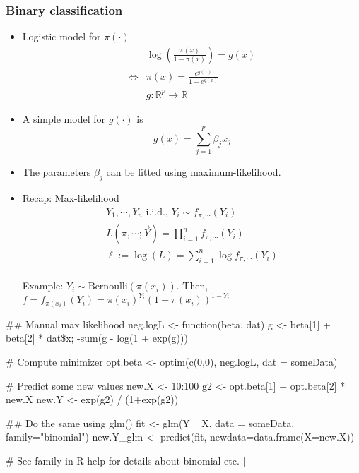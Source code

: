 \subsubsection{Binary classification}
\begin{theory}
 \begin{itemize}
  \item Logistic model for $\pi(\cdot)$
        \begin{align*}
                         & \log\left( \frac{\pi(x)}{1-\pi(x)} \right) = g(x)\\
         \Leftrightarrow & \pi(x) = \frac{e^{g(x)}}{1+e^{g(x)}}\\
                         & g: \mathbb{R}^p \rightarrow \mathbb{R}
        \end{align*}
  \item A simple model for $g(\cdot)$ is
        \begin{equation*}
         g(x) = \sum_{j=1}^p \beta_jx_j
        \end{equation*}
  \item The parameters $\beta_j$ can be fitted using maximum-likelihood.
  \item Recap: Max-likelihood
        \begin{gather*}
         Y_1, \cdots, Y_n \text{ i.i.d., } Y_i \sim f_{\pi, \cdots}(Y_i)\\
         L(\pi, \cdots; \vec{Y}) = \prod_{i=1}^n f_{\pi, \cdots}(Y_i)\\
         \ell := \log(L) = \sum_{i=1}^n \log f_{\pi, \cdots}(Y_i)
        \end{gather*}\\
        Example: $Y_i \sim \text{Bernoulli}(\pi(x_i))$. Then, $f = f_{\pi(x_i)}(Y_i) = \pi(x_i)^{Y_i} (1-\pi(x_i))^{1-Y_i}$
 \end{itemize}
\end{theory}

\begin{code}
 ## Manual max likelihood
 neg.logL <- function(beta, dat){
  g <- beta[1] + beta[2] * dat\$x;
  -sum(g - log(1 + exp(g)))
 }
 
 # Compute minimizer
 opt.beta <- optim(c(0,0), neg.logL, dat = someData)
 
 # Predict some new values
 new.X <- 10:100
 g2 <- opt.beta[1] + opt.beta[2] * new.X
 new.Y <- exp(g2) / (1+exp(g2))
 
 ## Do the same using glm()
 fit <- glm(Y ~ X, data = someData, family="binomial")
 new.Y_glm <- predict(fit, newdata=data.frame(X=new.X))
 
 # See family in R-help for details about binomial etc.
 |%
\end{code}



